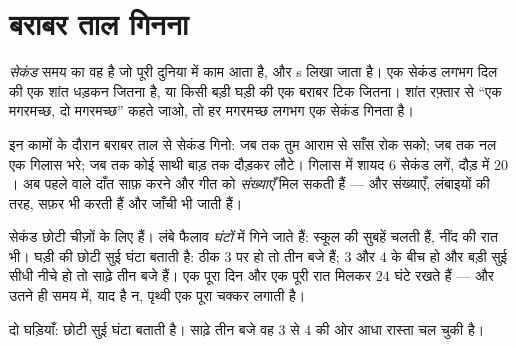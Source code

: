 \section{बराबर ताल गिनना}

\begin{definition}[सेकंड]\label{def:g2:measuring-time:second}
\emph{सेकंड} समय का वह  है जो पूरी दुनिया में काम
आता है, और \unit{s} लिखा जाता है। एक सेकंड लगभग दिल की एक शांत धड़कन
जितना है, या किसी बड़ी घड़ी की एक बराबर टिक जितना। शांत रफ़्तार से
``एक मगरमच्छ, दो मगरमच्छ'' कहते जाओ, तो हर मगरमच्छ लगभग एक सेकंड
गिनता है।
\end{definition}

\begin{example}[इसे करके देखो: कितने सेकंड?]\label{ex:g2:measuring-time:count}
इन कामों के दौरान बराबर ताल से सेकंड गिनो: जब तक तुम आराम से साँस
रोक सको; जब तक नल एक गिलास भरे; जब तक कोई साथी बाड़ तक दौड़कर लौटे।
गिलास में शायद $6$ सेकंड लगें, दौड़ में $20$। अब पहले वाले दाँत साफ़
करने और गीत को \emph{संख्याएँ} मिल सकती हैं --- और संख्याएँ, लंबाइयों
की तरह, सफ़र भी करती हैं और जाँची भी जाती हैं।
\end{example}

\begin{example}[घड़ी पर घंटे]\label{ex:g2:measuring-time:clock}
सेकंड छोटी चीज़ों के लिए हैं। लंबे फैलाव \emph{घंटों} में
गिने जाते हैं: स्कूल की सुबहें  चलती हैं, नींद की रात भी। घड़ी
की छोटी सुई घंटा बताती है: ठीक $3$ पर हो तो तीन बजे हैं; $3$ और $4$
के बीच हो और बड़ी सुई सीधी नीचे हो तो साढ़े तीन बजे हैं। एक पूरा दिन
और एक पूरी रात मिलकर $24$ घंटे रखते हैं --- और उतने ही समय में, याद
है न, पृथ्वी एक पूरा चक्कर लगाती है।
\end{example}

\begin{omfigure}

{\small दो घड़ियाँ: छोटी सुई घंटा बताती है। साढ़े तीन बजे वह $3$ से
$4$ की ओर आधा रास्ता चल चुकी है।}
\end{omfigure}

